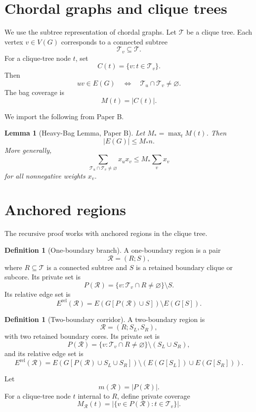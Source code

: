 \documentclass[11pt]{article}
\newtheorem{lemma}[theorem]{Lemma}
\theoremstyle{definition}
\newtheorem{definition}[theorem]{Definition}
\newcommand{\calT}{\mathcal T}
\newcommand{\calR}{\mathcal R}
\newcommand{\rel}{\mathrm{rel}}
\begin{document}
\section{Chordal graphs and clique trees}

We use the subtree representation of chordal graphs. Let \(\calT\) be a clique tree. Each vertex \(v\in V(G)\) corresponds to a connected subtree
\[
    \calT_v\subseteq\calT.
\]
For a clique-tree node \(t\), set
\[
    C(t)=\{v:t\in\calT_v\}.
\]
Then
\[
    uv\in E(G)
    \quad\Longleftrightarrow\quad
    \calT_u\cap\calT_v\neq\varnothing.
\]
The bag coverage is
\[
    M(t)=|C(t)|.
\]

We import the following from Paper B.

\begin{lemma}[Heavy-Bag Lemma, Paper B]\label{lem:import-heavy}
Let \(M_*=\max_tM(t)\). Then
\[
    |E(G)|\le M_*n.
\]
More generally,
\[
    \sum_{\calT_u\cap\calT_v\neq\varnothing}x_ux_v
    \le
    M_*\sum_vx_v
\]
for all nonnegative weights \(x_v\).
\end{lemma}

\section{Anchored regions}

The recursive proof works with anchored regions in the clique tree.

\begin{definition}[One-boundary branch]
A one-boundary region is a pair
\[
    \calR=(R;S),
\]
where \(R\subseteq\calT\) is a connected subtree and \(S\) is a retained boundary clique or subcore. Its private set is
\[
    P(\calR)
    =
    \{v:\calT_v\cap R\neq\varnothing\}\setminus S.
\]
Its relative edge set is
\[
    E^{\rel}(\calR)
    =
    E(G[P(\calR)\cup S])\setminus E(G[S]).
\]
\end{definition}

\begin{definition}[Two-boundary corridor]
A two-boundary region is
\[
    \calR=(R;S_L,S_R),
\]
with two retained boundary cores. Its private set is
\[
    P(\calR)
    =
    \{v:\calT_v\cap R\neq\varnothing\}
    \setminus(S_L\cup S_R),
\]
and its relative edge set is
\[
    E^{\rel}(\calR)
    =
    E(G[P(\calR)\cup S_L\cup S_R])
    \setminus
    \left(E(G[S_L])\cup E(G[S_R])\right).
\]
\end{definition}

Let
\[
    m(\calR)=|P(\calR)|.
\]
For a clique-tree node \(t\) internal to \(R\), define private coverage
\[
    M_{\calR}(t)
    =
    |\{v\in P(\calR):t\in\calT_v\}|.
\]
\end{document}
